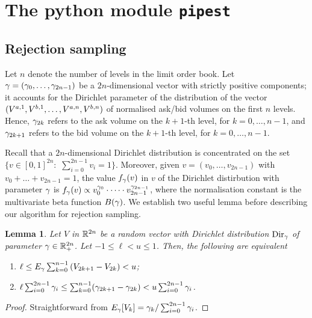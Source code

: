 \documentclass[10pt]{article}
\newtheorem{lemma}[thm]{Lemma}
\begin{document}
\section{The python module \texttt{pipest}}\label{sec.the_python_module}

\subsection{Rejection sampling}\label{sec.pipest.rejection_sampling}
Let $n$ denote the number of levels in the limit order book. Let $\dirparam=(\dirparam_{0},\dots,\dirparam_{2n-1})$ be a $2n$-dimensional vector with strictly positive components; it accounts for the Dirichlet parameter of the distribution of the vector $(\nthBestAskVolume[1],\nthBestBidVolume[1],\dots, \nthBestAskVolume[n],\nthBestBidVolume[n])$ of normalised ask/bid volumes on the first $n$ levels. Hence, $\dirparam_{2k}$ refers to the ask volume on the $k+1$-th level, for $k=0,\dots,n-1$, and 
$\dirparam_{2k+1}$ refers to the bid volume on the $k+1$-th level, for $k=0,\dots,n-1$. 

Recall that a $2n$-dimensional Dirichlet distribution is concentrated on the set $\lbrace v \in [0,1]^{2n}: \, \, \sum_{i=0}^{2n-1} v_i = 1 \rbrace$. Moreover, given $v=(v_0, \dots,v_{2n-1})$ with  $v_0 + \dots + v_{2n-1} = 1$, the value $\dirichletDensity(v)$ in $v$  of the Dirichlet distirbution with parameter $\dirparam$ is $\dirichletDensity(v) \propto v_{0}^{\dirparam_{0}} \cdot \dots \cdot v_{2n-1}^{\dirparam_{2n-1}}$, where  the normalisation constant is the multivariate beta function $B(\dirparam)$.
We establish two useful lemma before describing our algorithm for rejection sampling. 

\begin{lemma}\label{lemma.equivalence_expected_constraint}
 Let $V$ in $\R^{2n}$ be a random vector with Dirichlet distribution $\text{Dir}_{\dirparam}$ of parameter $\dirparam \in \R^{2n}_{+}$. Let  $-1\leq \ell < u \leq 1$. Then, the following are equivalent 
 \begin{enumerate}[label={\roman{*}.} , ref={\ref{lemma.equivalence_expected_constraint}.\roman{*}}]
  \item \label{lemma.equivalence_expected_constraint.expectation}$
  \ell \leq \Expectation_{\dirparam} \sum_{k=0}^{n-1} \left( V_{2k+1} - V_{2k} \right) < u $;
  \item \label{lemma.equivalence_expected_constraint.parameter} $\ell \sum_{i=0}^{2n-1}\dirparam_i 
  \leq 
  \sum_{k=0}^{n-1} (\dirparam_{2k+1} - \dirparam_{2k} ) 
  < u \sum_{i=0}^{2n-1}\dirparam_i
  $.
 \end{enumerate}
\end{lemma}
\begin{proof}
 Straightforward from $\Expectation_{\dirparam}[V_{k}] = \dirparam_{k}/\sum_{i=0}^{2n-1} \dirparam_{i}$.
\end{proof}
\end{document}
